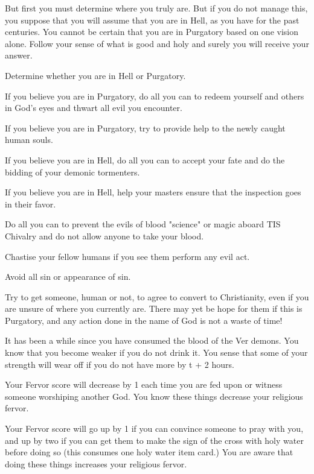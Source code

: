 \documentclass[char]{guildcamp4}
\begin{document}
But first you must determine where you truly are. But if you do not manage this, you suppose that you will assume that you are in Hell, as you have for the past centuries. You cannot be certain that you are in Purgatory based on one vision alone. Follow your sense of what is good and holy and surely you will receive your answer.

\begin{itemz}[Goals]
	\item Determine whether you are in Hell or Purgatory.
	\item If you believe you are in Purgatory, do all you can to redeem yourself and others in God's eyes and thwart all evil you encounter.
	\item If you believe you are in Purgatory, try to provide help to the newly caught human souls.
	\item If you believe you are in Hell, do all you can to accept your fate and do the bidding of your demonic tormenters.
	\item If you believe you are in Hell, help your masters ensure that the inspection goes in their favor.
	\item Do all you can to prevent the evils of blood "science" or magic aboard TIS Chivalry and do not allow anyone to take your blood.
	\item Chastise your fellow humans if you see them perform any evil act.
	\item Avoid all sin or appearance of sin.
	\item Try to get someone, human or not, to agree to convert to Christianity, even if you are unsure of where you currently are. There may yet be hope for them if this is Purgatory, and any action done in the name of God is not a waste of time!
\end{itemz}

\begin{itemz}[Notes]
	\item It has been a while since you have consumed the blood of the Ver demons. You know that you become weaker if you do not drink it. You sense that some of your strength will wear off if you do not have more by t + 2 hours.
	\item Your Fervor score will decrease by 1 each time you are fed upon or witness someone worshiping another God. You know these things decrease your religious fervor.
	\item Your Fervor score will go up by 1 if you can convince someone to pray with you, and up by two if you can get them to make the sign of the cross with holy water before doing so (this consumes one holy water item card.) You are aware that doing these things increases your religious fervor.
\end{itemz}
\end{document}
